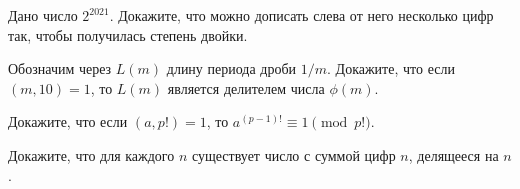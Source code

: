 \documentclass{article}
\begin{document}
\begin{enumerate_boxed}
        \item Дано число $2^{2021}$.
        Докажите, что можно дописать слева от него несколько цифр так, чтобы получилась степень двойки.

        \item Обозначим через  $L(m)$  длину периода дроби $1/m$.
        Докажите, что если  $(m, 10) = 1$,  то  $L(m)$  является делителем числа $\phi(m)$.

        \item Докажите, что если $(a, p!) = 1$, то $a^{(p-1)!} \equiv 1 \pmod{p!}$.

        \item Докажите, что для каждого $n$ существует число с суммой цифр $n$, делящееся на $n$.

    \end{enumerate_boxed}
\end{document}
